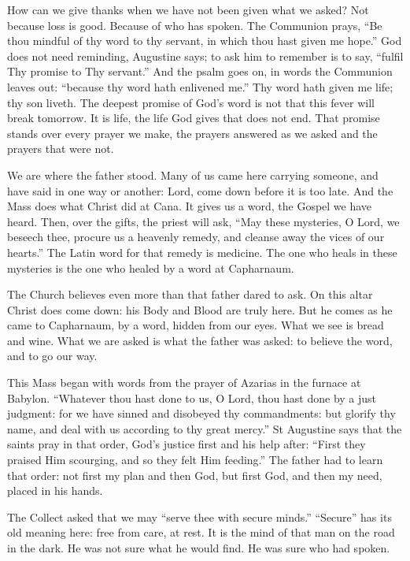 How can we give thanks when we have not been given what we asked? Not because
loss is good. Because of who has spoken. The Communion prays, ``Be thou mindful
of thy word to thy servant, in which thou hast given me hope.'' God does not
need reminding, Augustine says; to ask him to remember is to say, ``fulfil Thy
promise to Thy servant.'' And the psalm goes on, in words the Communion leaves
out: ``because thy word hath enlivened me.'' Thy word hath given me life; thy
son liveth. The deepest promise of God's word is not that this fever will break
tomorrow. It is life, the life God gives that does not end. That promise stands
over every prayer we make, the prayers answered as we asked and the prayers
that were not.

\medskip

We are where the father stood. Many of us came here carrying someone, and have
said in one way or another: Lord, come down before it is too late. And the
Mass does what Christ did at Cana. It gives us a word, the Gospel we have
heard. Then, over the gifts, the priest will ask, ``May these mysteries, O
Lord, we beseech thee, procure us a heavenly remedy, and cleanse away the vices
of our hearts.'' The Latin word for that remedy is medicine. The one who heals
in these mysteries is the one who healed by a word at Capharnaum.

The Church believes even more than that father dared to ask. On this altar
Christ does come down: his Body and Blood are truly here. But he comes as he
came to Capharnaum, by a word, hidden from our eyes. What we see is bread and
wine. What we are asked is what the father was asked: to believe the word, and
to go our way.

\medskip

This Mass began with words from the prayer of Azarias in the furnace at
Babylon. ``Whatever thou hast done to us, O Lord, thou hast done by a just
judgment: for we have sinned and disobeyed thy commandments: but glorify thy
name, and deal with us according to thy great mercy.'' St Augustine says that
the saints pray in that order, God's justice first and his help after: ``First
they praised Him scourging, and so they felt Him feeding.'' The father had to
learn that order: not first my plan and then God, but first God, and then my
need, placed in his hands.

The Collect asked that we may ``serve thee with secure minds.'' ``Secure'' has
its old meaning here: free from care, at rest. It is the mind of that man on
the road in the dark. He was not sure what he would find. He was sure who had
spoken.

